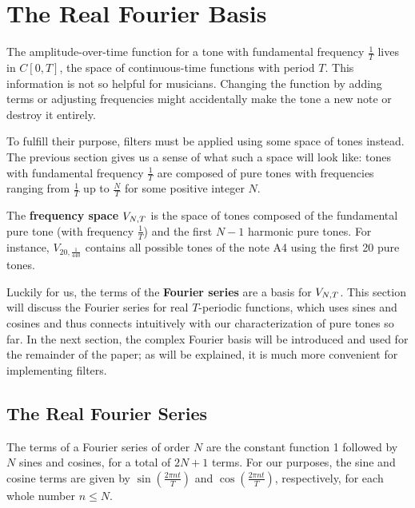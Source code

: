 
\section{The Real Fourier Basis}

\par \indentt The amplitude-over-time function for a tone with fundamental frequency $\frac{1}{T}$ lives in $C[0,T]$, the space of continuous-time functions with period $T$. This information is not so helpful for musicians. Changing the function by adding terms or adjusting frequencies might accidentally make the tone a new note or destroy it entirely.

\par \bigskip To fulfill their purpose, filters must be applied using some space of tones instead. The previous section gives us a sense of what such a space will look like: tones with fundamental frequency $\frac{1}{T}$ are composed of pure tones with frequencies ranging from $\frac{1}{T}$ up to $\frac{N}{T}$ for some positive integer $N$.

\begin{definition}
    \par The \textbf{frequency space} $V_{N,T}$ is the space of tones composed of the fundamental pure tone (with frequency $\frac{1}{T}$) and the first $N-1$ harmonic pure tones. For instance, $V_{20,\frac{1}{440}}$ contains all possible tones of the note A4 using the first 20 pure tones.
    
    \label{defn:VNT}
\end{definition}



\par \bigskip Luckily for us, the terms of the \textbf{Fourier series} are a basis for $V_{N,T}$. This section will discuss the Fourier series for real $T$-periodic functions, which uses sines and cosines and thus connects intuitively with our characterization of pure tones so far. In the next section, the complex Fourier basis will be introduced and used for the remainder of the paper; as will be explained, it is much more convenient for implementing filters.

\subsection{The Real Fourier Series}

\par \indentt The terms of a Fourier series of order $N$ are the constant function 1 followed by $N$ sines and cosines, for a total of $2N+1$ terms. For our purposes, the sine and cosine terms are given by $\sin(\frac{2\pi nt}{T})$ and $\cos(\frac{2\pi nt}{T})$, respectively, for each whole number $n \le N$.\cite{Ryan}

